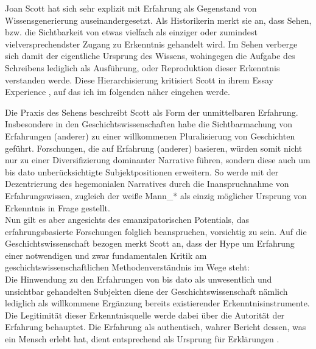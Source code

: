 Joan Scott hat sich sehr explizit mit Erfahrung als Gegenstand von
Wissensgenerierung auseinandergesetzt. Als Historikerin merkt sie an, dass
Sehen, bzw. die Sichtbarkeit von etwas vielfach als einziger oder zumindest
vielversprechendster Zugang zu Erkenntnis gehandelt wird. Im Sehen verberge
sich damit der eigentliche Ursprung des Wissens, wohingegen die Aufgabe des
Schreibens lediglich als Ausführung, oder Reproduktion dieser Erkenntnis
verstanden werde. Diese Hierarchisierung kritisiert Scott in ihrem Essay
\glqq Experience \grqq \footnotemark {}, auf das ich im folgenden näher eingehen werde.

Die Praxis des Sehens beschreibt Scott als Form der unmittelbaren Erfahrung.
Insbesondere in den Geschichtswissenschaften habe die Sichtbarmachung von
Erfahrungen (anderer) zu einer willkommenen \glqq Pluralisierung von
Geschichten \grqq \footnotemark {} geführt. Forschungen, die auf Erfahrung (anderer) basieren, würden somit
nicht nur zu einer Diversifizierung dominanter Narrative führen, sondern diese
auch um bis dato unberücksichtigte Subjektpositionen erweitern. 
\footnotemark {} So werde mit
der Dezentrierung des hegemonialen Narratives durch die Inanspruchnahme von
Erfahrungswissen, zugleich der weiße Mann\_* als einzig möglicher Ursprung von
Erkenntnis in Frage gestellt. \\
Nun gilt es aber angesichts des emanzipatorischen Potentials, das
erfahrungsbasierte Forschungen folglich beanspruchen, vorsichtig zu sein. Auf
die Geschichtswissenschaft bezogen merkt Scott an, dass der Hype um Erfahrung
einer notwendigen und zwar fundamentalen Kritik am geschichtswissenschaftlichen
Methodenverständnis im Wege steht: \\
Die Hinwendung zu den Erfahrungen von bis
dato als unwesentlich und unsichtbar gehandelten Subjekten diene der
Geschichtswissenschaft nämlich lediglich als willkommene Ergänzung bereits
existierender Erkenntnisinstrumente. Die Legitimität dieser Erkenntnisquelle
werde dabei über die \glqq Autorität der Erfahrung \grqq \footnotemark
{} behauptet. Die Erfahrung als \glqq authentisch, wahrer
Bericht dessen, was ein Mensch erlebt hat, dient entsprechend als Ursprung für
Erklärungen \grqq. \footnotemark {} 



